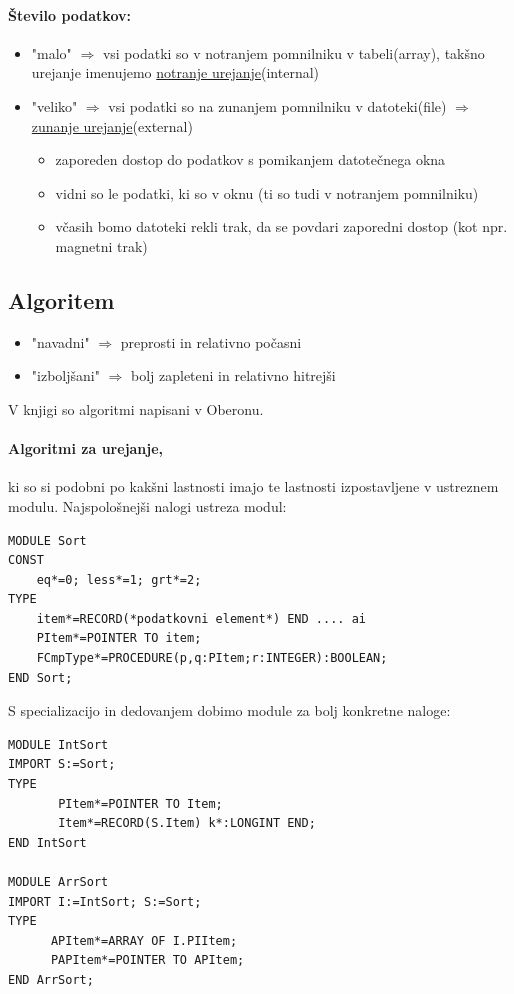 \documentclass[a4paper,10pt]{article}
\begin{document}
\paragraph{\v Stevilo podatkov:}
\begin{itemize}
	\item "malo" $\Rightarrow$ vsi podatki so v notranjem pomnilniku v tabeli(array), tak\v{s}no urejanje imenujemo \underline{notranje urejanje}(internal)
	\item "veliko" $\Rightarrow$ vsi podatki so na zunanjem pomnilniku v datoteki(file) $\Rightarrow$ \underline{zunanje urejanje}(external)
	\begin{itemize}
		\item zaporeden dostop do podatkov s pomikanjem datote\v{c}nega okna
		\item vidni so le podatki, ki so v oknu (ti so tudi v notranjem pomnilniku)
		\item v\v{c}asih bomo datoteki rekli trak, da se povdari zaporedni dostop (kot npr. magnetni trak)
	\end{itemize}
\end{itemize}

\subsection{Algoritem}

\begin{itemize}
	\item "navadni" $\Rightarrow$ preprosti in relativno po\v{c}asni
	\item "izbolj\v{s}ani" $\Rightarrow$ bolj zapleteni in relativno hitrej\v{s}i
\end{itemize}
V knjigi so algoritmi napisani v Oberonu.

\paragraph{Algoritmi za urejanje,} ki so si podobni po kak\v{s}ni lastnosti imajo te lastnosti izpostavljene v ustreznem modulu. Najspolo\v{s}nej\v{s}i nalogi ustreza modul:\\
\begin{lstlisting}
MODULE Sort
CONST
	eq*=0; less*=1; grt*=2;
TYPE
	item*=RECORD(*podatkovni element*) END .... ai
	PItem*=POINTER TO item;
	FCmpType*=PROCEDURE(p,q:PItem;r:INTEGER):BOOLEAN;
END Sort;
\end{lstlisting}
\vspace{10pt}
S specializacijo in dedovanjem dobimo module za bolj konkretne naloge:\\
\begin{lstlisting}
MODULE IntSort
IMPORT S:=Sort;
TYPE
       PItem*=POINTER TO Item;
       Item*=RECORD(S.Item) k*:LONGINT END;
END IntSort

MODULE ArrSort
IMPORT I:=IntSort; S:=Sort;
TYPE
      APItem*=ARRAY OF I.PIItem;
      PAPItem*=POINTER TO APItem;
END ArrSort;
\end{lstlisting}
\end{document}
